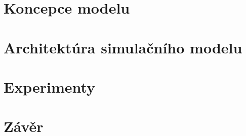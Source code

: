 \documentclass[a4paper, 11pt]{article}
\begin{document}
\section{Koncepce modelu}
\section{Architektúra simulačního modelu}
\section{Experimenty}
\section{Závěr}

\newpage
%
%
\end{document}
